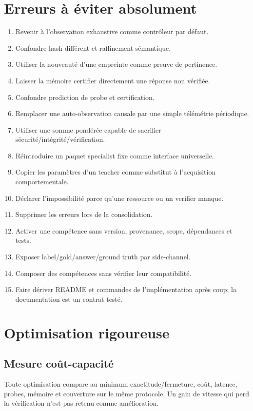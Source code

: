 \documentclass[11pt,a4paper]{report}
\begin{document}
\chapter{Erreurs à éviter absolument}
\begin{enumerate}
\item Revenir à l'observation exhaustive comme contrôleur par défaut.
\item Confondre hash différent et raffinement sémantique.
\item Utiliser la nouveauté d'une empreinte comme preuve de pertinence.
\item Laisser la mémoire certifier directement une réponse non vérifiée.
\item Confondre prediction de probe et certification.
\item Remplacer une auto-observation causale par une simple télémétrie périodique.
\item Utiliser une somme pondérée capable de sacrifier sécurité/intégrité/vérification.
\item Réintroduire un paquet specialist fixe comme interface universelle.
\item Copier les paramètres d'un teacher comme substitut à l'acquisition comportementale.
\item Déclarer l'impossibilité parce qu'une ressource ou un verifier manque.
\item Supprimer les erreurs lors de la consolidation.
\item Activer une compétence sans version, provenance, scope, dépendances et tests.
\item Exposer label/gold/answer/ground truth par side-channel.
\item Composer des compétences sans vérifier leur compatibilité.
\item Faire dériver README et commandes de l'implémentation après coup; la documentation est un contrat testé.
\end{enumerate}

\chapter{Optimisation rigoureuse}
\section{Mesure coût-capacité}
Toute optimisation compare au minimum exactitude/fermeture, coût, latence, probes, mémoire et couverture sur le même protocole. Un gain de vitesse qui perd la vérification n'est pas retenu comme amélioration.
\end{document}
